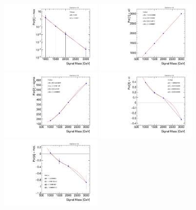 \begin{figure}[!h]
\begin{center}
\includegraphics*[width=0.45\textwidth]{./figures/boosted/SigInterpolation/ParamFit_GhhC10RW_Bukin_Graviton_Para0_max}
\includegraphics*[width=0.45\textwidth]{./figures/boosted/SigInterpolation/ParamFit_GhhC10RW_Bukin_Graviton_Para1_x0}\\
\includegraphics*[width=0.45\textwidth]{./figures/boosted/SigInterpolation/ParamFit_GhhC10RW_Bukin_Graviton_Para2_sigma}
\includegraphics*[width=0.45\textwidth]{./figures/boosted/SigInterpolation/ParamFit_GhhC10RW_Bukin_Graviton_Para3_xi}\\
\includegraphics*[width=0.45\textwidth]{./figures/boosted/SigInterpolation/ParamFit_GhhC10RW_Bukin_Graviton_Para4_rhoL}

\end{center}
\end{figure}
